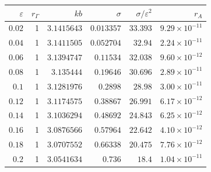 \begin{tabular}{rrrrrr}
\toprule
$\varepsilon$ & $r_\Gamma$ & $kb$ & $\sigma$ & $\sigma/\varepsilon^2$ & $r_A$ \\
\midrule
$0.02$ & 1 & $3.1415643$ & $0.013357$ & $33.393$ & $9.29\times10^{-11}$ \\
$0.04$ & 1 & $3.1411505$ & $0.052704$ & $32.94$ & $2.24\times10^{-11}$ \\
$0.06$ & 1 & $3.1394747$ & $0.11534$ & $32.038$ & $9.60\times10^{-12}$ \\
$0.08$ & 1 & $3.135444$ & $0.19646$ & $30.696$ & $2.89\times10^{-11}$ \\
$0.1$ & 1 & $3.1281976$ & $0.2898$ & $28.98$ & $3.00\times10^{-11}$ \\
$0.12$ & 1 & $3.1174575$ & $0.38867$ & $26.991$ & $6.17\times10^{-12}$ \\
$0.14$ & 1 & $3.1036294$ & $0.48692$ & $24.843$ & $6.25\times10^{-12}$ \\
$0.16$ & 1 & $3.0876566$ & $0.57964$ & $22.642$ & $4.10\times10^{-12}$ \\
$0.18$ & 1 & $3.0707552$ & $0.66338$ & $20.475$ & $7.76\times10^{-12}$ \\
$0.2$ & 1 & $3.0541634$ & $0.736$ & $18.4$ & $1.04\times10^{-11}$ \\
\bottomrule
\end{tabular}
